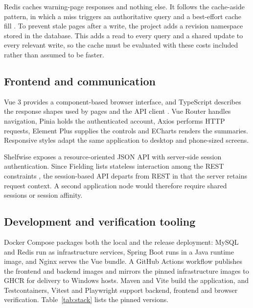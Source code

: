 Redis caches warning-page responses and nothing else. It follows the cache-aside pattern, in which a miss triggers an authoritative query and a best-effort cache fill \citep{redis-cache}. To prevent stale pages after a write, the project adds a revision namespace stored in the database. This adds a read to every query and a shared update to every relevant write, so the cache must be evaluated with these costs included rather than assumed to be faster.


\subsection{Frontend and communication}

Vue 3 provides a component-based browser interface, and TypeScript describes the response shapes used by pages and the API client \citep{vue}. Vue Router handles navigation, Pinia holds the authenticated account, Axios performs HTTP requests, Element Plus supplies the controls and ECharts renders the summaries. Responsive styles adapt the same application to desktop and phone-sized screens.


Shelfwise exposes a resource-oriented JSON API with server-side session authentication. Since Fielding lists stateless interaction among the REST constraints \citep{fielding2000}, the session-based API departs from REST in that the server retains request context. A second application node would therefore require shared sessions or session affinity.


\subsection{Development and verification tooling}

Docker Compose packages both the local and the release deployment: MySQL and Redis run as infrastructure services, Spring Boot runs in a Java runtime image, and Nginx serves the Vue bundle. A GitHub Actions workflow publishes the frontend and backend images and mirrors the pinned infrastructure images to GHCR for delivery to Windows hosts. Maven and Vite build the application, and Testcontainers, Vitest and Playwright support backend, frontend and browser verification. Table~\ref{tab:stack} lists the pinned versions.


